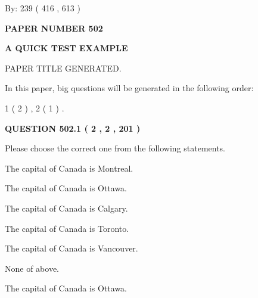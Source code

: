 \documentclass[12pt]{article}
\begin{document}
   
\hspace{1.0in} By: 
 239 ( 416 ,  613 )
   
   
   
   
\newpage 
\setcounter{page}{ 
   502001 } 
   
   
   
   
 {\textbf{ \Large{ PAPER NUMBER  502  }}}
   
   
\vspace{0.2in}
   
   
   
   
   
   
   
   
 \vspace{0.2in}
{\LARGE {\textbf{ A QUICK TEST EXAMPLE}}}
   
   
 PAPER TITLE GENERATED.
   
   
   
\vspace{0.2in}
   
In this paper, big questions will be generated in the following order: 
   
   
   1 ( 2 )
 ,
   2 ( 1 )
 .
  
\vspace{0.2in}
  
{\textbf{\Large{QUESTION
502.1 
 ( 2 , 2 , 201 )
}}}
  
  
Please choose the correct one from the following statements.
 
 
The capital of Canada is Montreal.
 
 
The capital of Canada is Ottawa.
 
 
The capital of Canada is Calgary.
 
 
The capital of Canada is Toronto.
 
 
The capital of Canada is Vancouver.
 
 
 None of above.
 
 
\noindent{}
 
 
The capital of Canada is Ottawa.
 
 
\noindent{}
 
\end{document}
